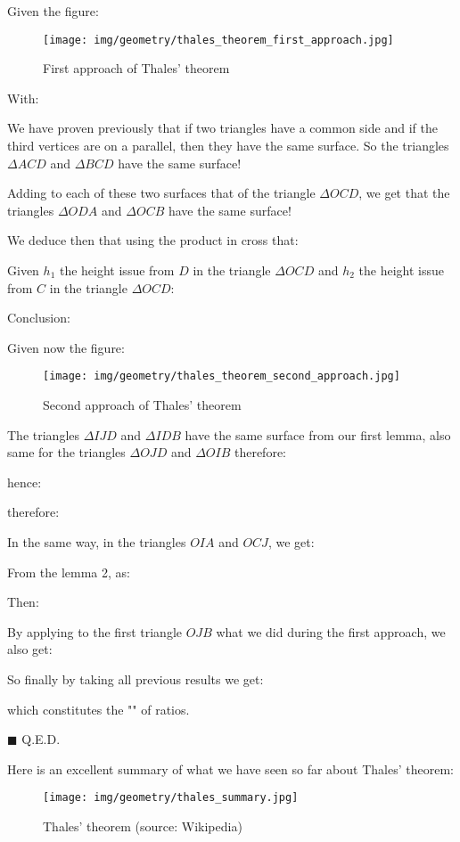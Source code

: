 	\begin{dem}
	Given the figure:
	\begin{figure}[H]
		\centering
		\texttt{[image: img/geometry/thales\_theorem\_first\_approach.jpg]}
		\caption{First approach of Thales' theorem}
	\end{figure}
	With:
	
	We have proven previously that if two triangles have a common side and if the third vertices are on a parallel, then they have the same surface. So the triangles $\Delta ACD$ and $\Delta BCD$ have the same surface!

	Adding to each of these two surfaces that of the triangle $\Delta OCD$, we get that the triangles $\Delta ODA$ and $\Delta OCB$ have the same surface!

	We deduce then that using the product in cross that:
	
	Given $h_1$ the height issue from $D$ in the triangle $\Delta OCD$ and $h_2$ the height issue from $C$ in the triangle $\Delta OCD$:
	
	Conclusion:
	
	Given now the figure:
	\begin{figure}[H]
		\centering
		\texttt{[image: img/geometry/thales\_theorem\_second\_approach.jpg]}
		\caption{Second approach of Thales' theorem}
	\end{figure}
	The triangles $\Delta IJD$ and $\Delta IDB$ have the same surface from our first lemma, also same for the triangles $\Delta OJD$ and $\Delta OIB$ therefore:
	
	hence:
	
	therefore:
	
	In the same way, in the triangles $OIA$ and $OCJ$, we get:
	
	From the lemma 2, as:
	
	Then:
	
	By applying to the first triangle $OJB$ what we did during the first approach, we also get:
	
	So finally by taking all previous results we get:
	
	which constitutes the "" of ratios.
	\begin{flushright}
		$\blacksquare$  Q.E.D.
	\end{flushright}
	\end{dem}
	
	Here is an excellent summary of what we have seen so far about Thales' theorem:
	\begin{figure}[H]
		\centering
		\texttt{[image: img/geometry/thales\_summary.jpg]}
		\caption[Thales' theorem]{Thales' theorem (source: Wikipedia)}
	\end{figure}
	
